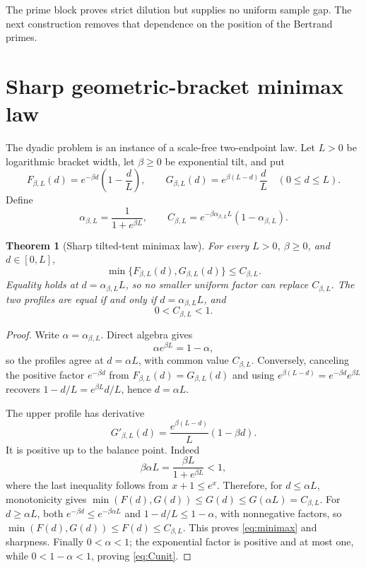 \documentclass[11pt]{article}
\newtheorem{theorem}{Theorem}[section]
\begin{document}
The prime block proves strict dilution but supplies no uniform sample gap.  The next construction
removes that dependence on the position of the Bertrand primes.

\section{Sharp geometric-bracket minimax law}\leavevmode\par

The dyadic problem is an instance of a scale-free two-endpoint law.  Let $L>0$ be logarithmic
bracket width, let $\beta\ge0$ be exponential tilt, and put
\begin{equation}\label{eq:profiles}
 F_{\beta,L}(d)=e^{-\beta d}\left(1-\frac dL\right),\qquad
 G_{\beta,L}(d)=e^{\beta(L-d)}\frac dL
 \quad(0\le d\le L).
\end{equation}
Define
\begin{equation}\label{eq:balance}
 \alpha_{\beta,L}=\frac1{1+e^{\beta L}},\qquad
 C_{\beta,L}=e^{-\beta\alpha_{\beta,L}L}(1-\alpha_{\beta,L}).
\end{equation}

\begin{theorem}[Sharp tilted-tent minimax law]\label{thm:minimax}
For every $L>0$, $\beta\ge0$, and $d\in[0,L]$,
\begin{equation}\label{eq:minimax}
 \min\{F_{\beta,L}(d),G_{\beta,L}(d)\}\le C_{\beta,L}.
\end{equation}
Equality holds at $d=\alpha_{\beta,L}L$, so no smaller uniform factor can replace
$C_{\beta,L}$.  The two profiles are equal if and only if
$d=\alpha_{\beta,L}L$, and
\begin{equation}\label{eq:Cunit}
 0<C_{\beta,L}<1.
\end{equation}
\end{theorem}

\begin{proof}
Write $\alpha=\alpha_{\beta,L}$.  Direct algebra gives
\begin{equation}\label{eq:balanceidentity}
 \alpha e^{\beta L}=1-\alpha,
\end{equation}
so the profiles agree at $d=\alpha L$, with common value $C_{\beta,L}$.
Conversely, canceling the positive factor $e^{-\beta d}$ from
$F_{\beta,L}(d)=G_{\beta,L}(d)$ and using
$e^{\beta(L-d)}=e^{-\beta d}e^{\beta L}$ recovers
$1-d/L=e^{\beta L}d/L$, hence $d=\alpha L$.

The upper profile has derivative
\[
 G'_{\beta,L}(d)=\frac{e^{\beta(L-d)}}L(1-\beta d).
\]
It is positive up to the balance point.  Indeed
\[
 \beta\alpha L=\frac{\beta L}{1+e^{\beta L}}<1,
\]
where the last inequality follows from $x+1\le e^x$.  Therefore, for
$d\le\alpha L$, monotonicity gives
$\min(F(d),G(d))\le G(d)\le G(\alpha L)=C_{\beta,L}$.
For $d\ge\alpha L$, both
$e^{-\beta d}\le e^{-\beta\alpha L}$ and
$1-d/L\le1-\alpha$, with nonnegative factors, so
$\min(F(d),G(d))\le F(d)\le C_{\beta,L}$.
This proves \eqref{eq:minimax} and sharpness.  Finally $0<\alpha<1$; the exponential factor is
positive and at most one, while $0<1-\alpha<1$, proving \eqref{eq:Cunit}.
\end{proof}
\end{document}
